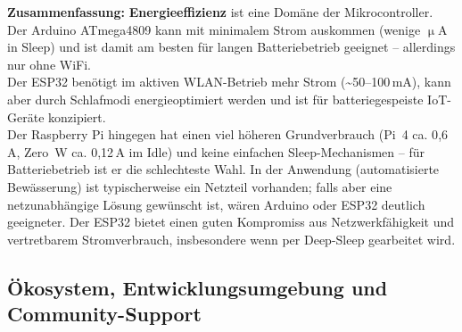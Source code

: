 \noindent\textbf{Zusammenfassung:} \textbf{Energieeffizienz} ist eine Domäne der Mikrocontroller. Der Arduino ATmega4809 kann mit minimalem Strom auskommen (wenige $\upmu$A in Sleep) und ist damit am besten für langen Batteriebetrieb geeignet – allerdings nur ohne WiFi. 
\\
Der ESP32 benötigt im aktiven WLAN-Betrieb mehr Strom (\textasciitilde50–100\,mA), kann aber durch Schlafmodi energieoptimiert werden und ist für batteriegespeiste IoT-Geräte konzipiert. 
\\
Der Raspberry Pi hingegen hat einen viel höheren Grundverbrauch (Pi~4 ca. 0{,}6\,A, Zero~W ca. 0{,}12\,A im Idle) und keine einfachen Sleep-Mechanismen – für Batteriebetrieb ist er die schlechteste Wahl. In der Anwendung (automatisierte Bewässerung) ist typischerweise ein Netzteil vorhanden; falls aber eine netzunabhängige Lösung gewünscht ist, wären Arduino oder ESP32 deutlich geeigneter. Der ESP32 bietet einen guten Kompromiss aus Netzwerkfähigkeit und vertretbarem Stromverbrauch, insbesondere wenn per Deep-Sleep gearbeitet wird.

\subsection{Ökosystem, Entwicklungsumgebung und Community-Support}

